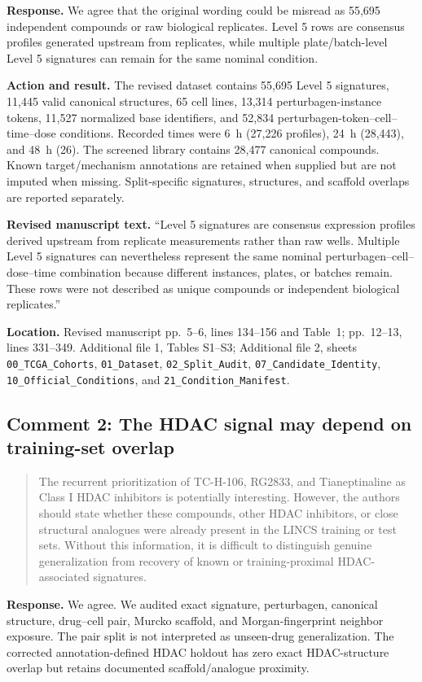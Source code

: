 \documentclass[10pt]{article}
\newenvironment{reviewcomment}{%
  \begin{quote}\small\itshape\color{black}
}{\end{quote}}
\newcommand{\Response}{\textbf{Response.} }
\newcommand{\Action}{\textbf{Action and result.} }
\newcommand{\RevisedText}{\textbf{Revised manuscript text.} }
\newcommand{\Location}{\textbf{Location.} }
\newcommand{\qtext}[1]{``#1''}
\begin{document}
\Response We agree that the original wording could be misread as 55,695 independent compounds or raw biological replicates. Level 5 rows are consensus profiles generated upstream from replicates, while multiple plate/batch-level Level 5 signatures can remain for the same nominal condition.

\Action The revised dataset contains 55,695 Level 5 signatures, 11,445 valid canonical structures, 65 cell lines, 13,314 perturbagen-instance tokens, 11,527 normalized base identifiers, and 52,834 perturbagen-token--cell--time--dose conditions. Recorded times were 6~h (27,226 profiles), 24~h (28,443), and 48~h (26). The screened library contains 28,477 canonical compounds. Known target/mechanism annotations are retained when supplied but are not imputed when missing. Split-specific signatures, structures, and scaffold overlaps are reported separately.

\RevisedText \qtext{Level 5 signatures are consensus expression profiles derived upstream from replicate measurements rather than raw wells. Multiple Level 5 signatures can nevertheless represent the same nominal perturbagen--cell--dose--time combination because different instances, plates, or batches remain. These rows were not described as unique compounds or independent biological replicates.}

\Location Revised manuscript pp.~5--6, lines 134--156 and Table~1; pp.~12--13, lines 331--349. Additional file 1, Tables S1--S3; Additional file 2, sheets \texttt{00\_TCGA\_Cohorts}, \texttt{01\_Dataset}, \texttt{02\_Split\_Audit}, \texttt{07\_Candidate\_Identity}, \texttt{10\_Official\_Conditions}, and \texttt{21\_Condition\_Manifest}.

\subsection*{Comment 2: The HDAC signal may depend on training-set overlap}
\begin{reviewcomment}
The recurrent prioritization of TC-H-106, RG2833, and Tianeptinaline as Class I HDAC inhibitors is potentially interesting. However, the authors should state whether these compounds, other HDAC inhibitors, or close structural analogues were already present in the LINCS training or test sets. Without this information, it is difficult to distinguish genuine generalization from recovery of known or training-proximal HDAC-associated signatures.
\end{reviewcomment}

\Response We agree. We audited exact signature, perturbagen, canonical structure, drug--cell pair, Murcko scaffold, and Morgan-fingerprint neighbor exposure. The pair split is not interpreted as unseen-drug generalization. The corrected annotation-defined HDAC holdout has zero exact HDAC-structure overlap but retains documented scaffold/analogue proximity.
\end{document}
